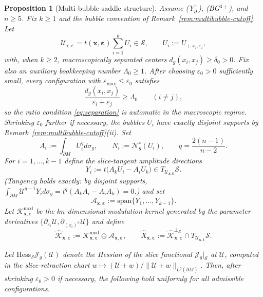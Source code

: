 \documentclass[11pt,reqno,a4paper]{amsart}
\numberwithin{equation}{section}
\theoremstyle{plain}
\newtheorem{proposition}[theorem]{Proposition}
\theoremstyle{remark}
\theoremstyle{plain}
\begin{document}
\begin{proposition}[Multi-bubble saddle structure]
\label{prop:multibubble-saddle-gap}
Assume \textup{(Y$^+_{\partial}$)}, \textup{(BG$^{3+}$)}, and $n\ge5$.
Fix $k\ge1$ and the bubble convention of Remark~\ref{rem:multibubble-cutoff}.
Let
\[
\mathcal U_{\mathbf x,\boldsymbol\varepsilon}
=t(\mathbf x,\boldsymbol\varepsilon)\sum_{i=1}^k U_i\in\mathcal S,
\qquad
U_i:=U_{+,x_i,\varepsilon_i},
\]
with, when $k\ge2$, macroscopically separated centers
$d_g(x_i,x_j)\ge\delta_0>0$.  Fix also an auxiliary bookkeeping number
$\Lambda_0\ge1$.  After choosing $\varepsilon_0>0$ sufficiently small, every
configuration with $\varepsilon_{\max}\le\varepsilon_0$ satisfies
\begin{equation}\label{eq:saddle-gap-auto-separation}
\frac{d_g(x_i,x_j)}{\varepsilon_i+\varepsilon_j}\ge \Lambda_0
\qquad(i\ne j),
\end{equation}
so the ratio condition \eqref{eq:separation} is automatic in the macroscopic
regime.  Shrinking $\varepsilon_0$ further if necessary, the bubbles $U_i$ have
exactly disjoint supports by Remark~\ref{rem:multibubble-cutoff}\textup{(ii)}.
Set
\[
A_i:=\int_{\partial M} U_i^qd\sigma_g,
\qquad
N_i:=\mathcal N_g^\circ(U_i),
\qquad q=\frac{2(n-1)}{n-2}.
\]
For $i=1,\dots,k-1$ define the slice-tangent amplitude directions
\[
Y_i:=t\big(A_kU_i-A_iU_k\big)\in T_{\mathcal U_{\mathbf x,\boldsymbol\varepsilon}}\mathcal S.
\]
(Tangency holds exactly: by disjoint supports,
$\int_{\partial M}\mathcal U^{q-1}Y_id\sigma_g
=t^q(A_k A_i-A_i A_k)=0$.)
and set
\[
\mathcal A_{\mathbf x,\boldsymbol\varepsilon}
:=\mathrm{span}\{Y_1,\dots,Y_{k-1}\}.
\]
Let $\mathcal K_{\mathbf x,\boldsymbol\varepsilon}^{\mathrm{mod}}$ be the $kn$-dimensional modulation kernel
generated by the parameter derivatives $\{\partial_{\varepsilon_i}\mathcal U,\partial_{(x_i)^\alpha}\mathcal U\}$
and define
\[
\widehat{\mathcal K}_{\mathbf x,\boldsymbol\varepsilon}
:=\mathcal K_{\mathbf x,\boldsymbol\varepsilon}^{\mathrm{mod}}\oplus \mathcal A_{\mathbf x,\boldsymbol\varepsilon},
\qquad
\widehat X_{\mathbf x,\boldsymbol\varepsilon}
:=\widehat{\mathcal K}_{\mathbf x,\boldsymbol\varepsilon}^{\perp_E}\cap T_{\mathcal U_{\mathbf x,\boldsymbol\varepsilon}}\mathcal S.
\]

Let $\mathrm{Hess}_{\mathcal S}\mathcal J_g(\mathcal U)$ denote the Hessian of the slice functional
$\mathcal J_g|_{\mathcal S}$ at $\mathcal U$, computed in the slice-retraction chart
$w\mapsto (\mathcal U+w)/\|\mathcal U+w\|_{L^q(\partial M)}$.
Then, after shrinking $\varepsilon_0>0$ if necessary, the following hold uniformly for all admissible configurations.


\end{proposition}
\end{document}
